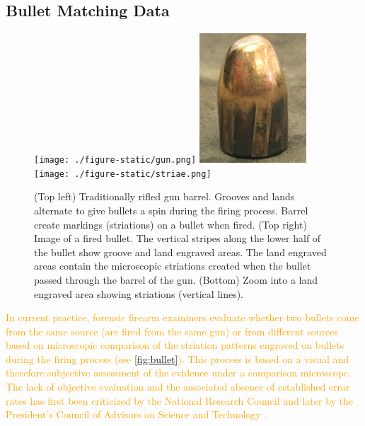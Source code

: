 \documentclass[AMS,STIX2COL]{WileyNJD-v2}\usepackage[]{graphicx}\usepackage[]{color}
\newcommand{\hh}[1]{\textcolor{orange}{#1}}
\begin{document}
{\subsection{Bullet Matching Data}

\begin{figure}[!t]
\centering
\texttt{[image: ./figure-static/gun.png]}
\includegraphics[width=1.58in]{./figure-static/bullet.png}
\texttt{[image: ./figure-static/striae.png]}
\caption{%
(Top left) Traditionally rifled gun barrel. Grooves and lands alternate to give bullets a spin during the firing process.
Barrel create markings (striations) on a bullet when fired.
(Top right) Image of a fired bullet. The vertical stripes along the lower half of the bullet show groove and land engraved areas. The land engraved areas contain the microscopic striations created when the bullet passed through the barrel of the gun. (Bottom) Zoom into a land engraved area showing striations (vertical lines). }
\label{fig:bullet}
\end{figure}

\hh{In current practice, forensic firearm  examiners evaluate whether two bullets come from the same source (are fired from the same gun) or from different sources based on microscopic comparison of the striation patterns engraved on bullets during the firing process (see \autoref{fig:bullet}). }
\hh{This process is based on a visual and therefore subjective assessment of the evidence under a comparison microscope. }
\hh{The lack of objective evaluation and the associated absence of established error rates has first been criticized by the National Research Council \cite{nrc:2009} and later by the President's Council of Advisors on Science and Technology \cite{pcast:2016}.}

}
\end{document}
